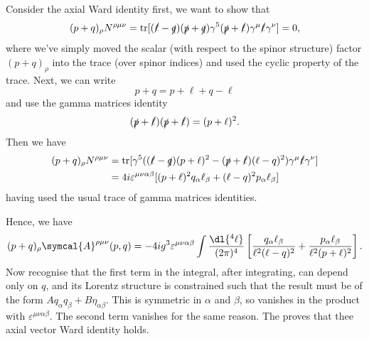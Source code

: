 \documentclass[fleqn]{NotesClass}
\newcommand{\amplitude}{\symcal{A}}
\newcommand{\minkowskiMetric}{\eta}
\DeclareMathOperator{\tr}{tr}
\begin{document}
    Consider the axial Ward identity first, we want to show that
    \begin{equation}
        (p + q)_\rho N^{\rho\mu\nu} = \tr[(\slashed{\ell} - \slashed{q})(\slashed{p} + \slashed{q}) \gamma^5(\slashed{p} + \slashed{\ell})\gamma^\mu \slashed{\ell}\gamma^\nu] = 0,
    \end{equation}
    where we've simply moved the scalar (with respect to the spinor structure) factor \((p + q)_\rho\) into the trace (over spinor indices) and used the cyclic property of the trace.
    Next, we can write
    \begin{equation}
        p + q = p + \ell + q - \ell
    \end{equation}
    and use the gamma matrices identity
    \begin{equation}
        (\slashed{p} + \slashed{\ell}) (\slashed{p} + \slashed{\ell}) = (p + \ell)^2.
    \end{equation}
    Then we have
    \begin{align}
        (p + q)_\rho N^{\rho\mu\nu} &= \tr[\gamma^5((\slashed{\ell} - \slashed{q})(p + \ell)^2 - (\slashed{p} + \slashed{\ell})(\ell - q)^2)\gamma^\mu \slashed{\ell}\gamma^\nu]\\
        &= 4i\varepsilon^{\mu\nu\alpha\beta}[(p + \ell)^2q_\alpha \ell_\beta + (\ell - q)^2p_\alpha \ell_\beta]
    \end{align}
    having used the usual trace of gamma matrices identities.
    
    Hence, we have
    \begin{equation}
        (p + q)_\rho \amplitude^{\rho\mu\nu}(p, q) = -4ig^3 \varepsilon^{\mu\nu\alpha\beta} \int \frac{\dl{^4\ell}}{(2\pi)^4} \left[ \frac{q_\alpha \ell_\beta}{\ell^2(\ell - q)^2} + \frac{p_\alpha \ell_\beta}{\ell^2(p + \ell)^2} \right].
    \end{equation}
    Now recognise that the first term in the integral, after integrating, can depend only on \(q\), and its Lorentz structure is constrained such that the result must be of the form \(Aq_\alpha q_\beta + B\minkowskiMetric_{\alpha\beta}\).
    This is symmetric in \(\alpha\) and \(\beta\), so vanishes in the product with \(\varepsilon^{\mu\nu\alpha\beta}\).
    The second term vanishes for the same reason.
    The proves that thee axial vector Ward identity holds.
    
\end{document}

